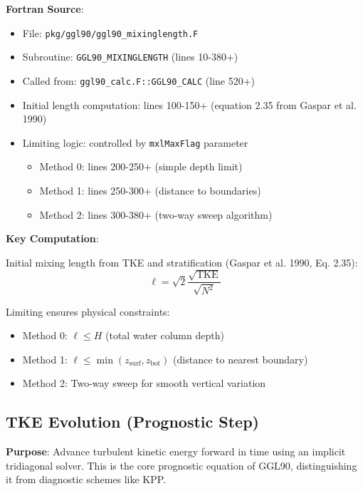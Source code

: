 \documentclass[11pt]{article}
\begin{document}
\textbf{Fortran Source}:
\begin{itemize}
    \item File: \verb|pkg/ggl90/ggl90_mixinglength.F|
    \item Subroutine: \verb|GGL90_MIXINGLENGTH| (lines 10-380+)
    \item Called from: \verb|ggl90_calc.F::GGL90_CALC| (line 520+)
    \item Initial length computation: lines 100-150+ (equation 2.35 from Gaspar et al. 1990)
    \item Limiting logic: controlled by \verb|mxlMaxFlag| parameter
        \begin{itemize}
            \item Method 0: lines 200-250+ (simple depth limit)
            \item Method 1: lines 250-300+ (distance to boundaries)
            \item Method 2: lines 300-380+ (two-way sweep algorithm)
        \end{itemize}
\end{itemize}

\textbf{Key Computation}:

Initial mixing length from TKE and stratification (Gaspar et al. 1990, Eq. 2.35):
\begin{equation}
\ell = \sqrt{2} \frac{\sqrt{\text{TKE}}}{\sqrt{N^2}}
\end{equation}

Limiting ensures physical constraints:
\begin{itemize}
    \item Method 0: $\ell \leq H$ (total water column depth)
    \item Method 1: $\ell \leq \min(z_{\text{surf}}, z_{\text{bot}})$ (distance to nearest boundary)
    \item Method 2: Two-way sweep for smooth vertical variation
\end{itemize}

\subsection{TKE Evolution (Prognostic Step)}

\textbf{Purpose}: Advance turbulent kinetic energy forward in time using an implicit tridiagonal solver. This is the core prognostic equation of GGL90, distinguishing it from diagnostic schemes like KPP.
\end{document}
